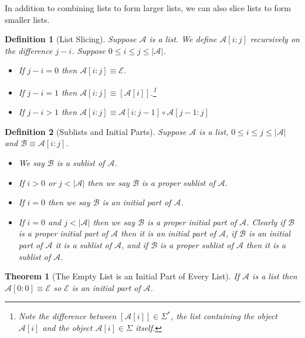 \documentclass[12pt]{article}
\theoremstyle{break}
\newtheorem{definition}{Definition}[section]
\theoremstyle{break}
\newtheorem{theorem}{Theorem}[section]
\theoremstyle{break}
\theoremstyle{break}
\newcommand{\mc}[1]{\mathcal{#1}}
\begin{document}
In addition to combining lists to form larger lists, we can also slice lists to form smaller lists.

\begin{definition}[List Slicing]
Suppose $\mc{A}$ is a list.
We define $\mc{A}[i:j]$ recursively on the difference $j-i$. Suppose $0 \le i \le j \le |\mc{A}|$.

\begin{itemize}
\item{If $j-i=0$ then $\mc{A}[i:j] \equiv \mc{E}$.}
\item{If $j-i=1$ then $\mc{A}[i:j] \equiv [\mc{A}[i]]$.\footnote{Note the difference between $[\mc{A}[i]]\in \Sigma^*$, the list containing the object $\mc{A}[i]$ and the object $\mc{A}[i]\in \Sigma$ itself.}}
\item{If $j-i>1$ then $\mc{A}[i:j] \equiv \mc{A}[i:j-1]\circ\mc{A}[j-1:j]$}
\end{itemize}
\end{definition}

\begin{definition}[Sublists and Initial Parts]
Suppose $\mc{A}$ is a list, $0\le i \le j \le |\mc{A}|$ and $\mc{B} \equiv \mc{A}[i:j]$.
\begin{itemize}
\item{We say $\mc{B}$ is a sublist of $\mc{A}$.}
\item{If $i>0$ or $j<|\mc{A}|$ then we say $\mc{B}$ is a proper sublist of $\mc{A}$.}
\item{If $i=0$ then we say $\mc{B}$ is an initial part of $\mc{A}$.}
\item{If $i=0$ and $j < |\mc{A}|$ then we say $\mc{B}$ is a proper initial part of $\mc{A}$.}
Clearly if $\mc{B}$ is a proper initial part of $\mc{A}$ then it is an initial part of $\mc{A}$, if $\mc{B}$ is an initial part of $\mc{A}$ it is a sublist of $\mc{A}$, and if $\mc{B}$ is a proper sublist of $\mc{A}$ then it is a sublist of $\mc{A}$.
\end{itemize}
\end{definition}

\begin{theorem}[The Empty List is an Initial Part of Every List]
\label{thm:emptylistinitialpart}
If $\mc{A}$ is a list then $\mc{A}[0:0] \equiv \mc{E}$ so $\mc{E}$ is an initial part of $\mc{A}$.
\end{theorem}
\end{document}
